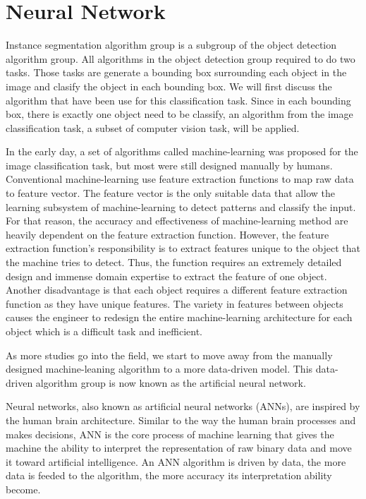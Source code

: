 \chapter{Neural Network} \label{chap:neural_network}

Instance segmentation algorithm group is a subgroup of the object detection algorithm group. All algorithms in the object detection group required to do two tasks. Those tasks are generate a bounding box surrounding each object in the image and clasify the object in each bounding box. We will first discuss the algorithm that have been use for this classification task. Since in each bounding box, there is exactly one object need to be classify, an algorithm from the image classification task, a subset of computer vision task, will be applied.

In the early day, a set of algorithms called machine-learning was proposed for the image classification task, but most were still designed manually by humans. Conventional machine-learning use feature extraction functions to map raw data to feature vector. The feature vector is the only suitable data that allow the learning subsystem of machine-learning to detect patterns and classify the input. For that reason, the accuracy and effectiveness of machine-learning method are heavily dependent on the feature extraction function. However, the feature extraction function's responsibility is to extract features unique to the object that the machine tries to detect. Thus, the function requires an extremely detailed design and immense domain expertise to extract the feature of one object. Another disadvantage is that each object requires a different feature extraction function as they have unique features. The variety in features between objects causes the engineer to redesign the entire machine-learning architecture for each object which is a difficult task and inefficient.

As more studies go into the field, we start to move away from the manually designed machine-leaning algorithm to a more data-driven model. This data-driven algorithm group is now known as the artificial neural network.

Neural networks, also known as artificial neural networks (ANNs), are inspired by the human brain architecture. Similar to the way the human brain processes and makes decisions, ANN is the core process of machine learning that gives the machine the ability to interpret the representation of raw binary data and move it toward artificial intelligence. An ANN algorithm is driven by data, the more data is feeded to the algorithm, the more accuracy its interpretation ability become.


